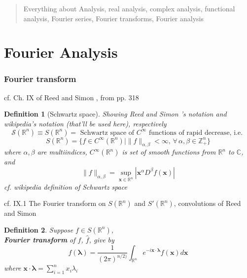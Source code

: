 \documentclass[10pt]{amsart}
\newtheorem{definition}{Definition}
\begin{document}
\begin{multicols*}{2}

  
\setcounter{tocdepth}{1}
\tableofcontents



\begin{abstract}
Everything about Analysis, real analysis, complex analysis, functional analysis, Fourier series, Fourier transforms, Fourier analysis    

\end{abstract}

\part{Fourier Analysis}

\section{Fourier transform}

cf. Ch. IX of Reed and Simon \cite{ReSi1980}, from pp. 318

\begin{definition}[Schwartz space]
Showing Reed and Simon \cite{ReSi1980}'s notation and wikipedia's notation (that'll be used here), respectively
\[
	\mathcal{S}(\mathbb{R}^n) \equiv S(\mathbb{R}^n) = \text{ Schwartz space of $C^{\infty}$ functions of rapid decrease, i.e. } 
	\]
	\begin{equation}
	S(\mathbb{R}^n) = \lbrace f\in C^{\infty}(\mathbb{R}^n) | \| f\|_{\alpha, \beta} < \infty, \, \forall \, \alpha, \beta \in \mathbb{Z}^n_+ \rbrace 
	\end{equation}
	where $\alpha , \beta$ are multiindices, $C^{\infty}(\mathbb{R}^n)$ is set of smooth functions from $\mathbb{R}^n$ to $\mathbb{C}$, and 
	\begin{equation}
	\| f\|_{\alpha,\beta} = \sup_{\mathbf{x} \in \mathbb{R}^n }{ | \mathbf{x}^{\alpha} D^{\beta} f(\mathbf{x}) | }
	\end{equation}
cf. wikipedia definition of Schwartz space
\end{definition}

cf. IX.1 The Fourier transform on $S(\mathbb{R}^n)$ and $S'(\mathbb{R}^n)$, convolutions of Reed and Simon \cite{ReSi1980}  

\begin{definition}
	Suppose $f\in S(\mathbb{R}^n)$, \\
	\textbf{Fourier transform} of $f$, $\widehat{f}$, give by 
	\begin{equation}
	\widehat{f}(\mathbf{\lambda}) = \frac{1}{(2\pi)^{n/2)}} \int_{\mathbb{R}^n} e^{-i \mathbf{x}\cdot \mathbf{\lambda} } f(\mathbf{x})d\mathbf{x} 
	\end{equation}
	where $\mathbf{x} \cdot \mathbf{\lambda}  =\sum_{i=1}^n x_i \lambda_i $  
	

\end{definition}
\end{multicols*}
\end{document}
